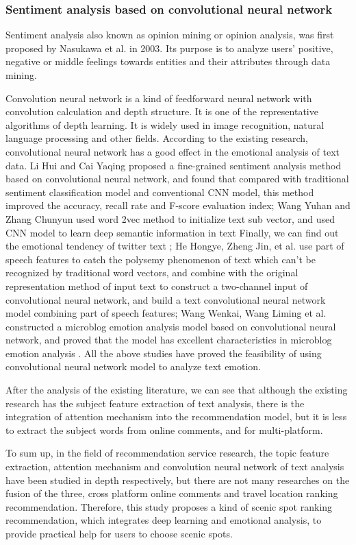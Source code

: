 \documentclass[conference]{IEEEtran}
\begin{document}
\subsubsection{Sentiment analysis based on convolutional neural network}
Sentiment analysis also known as opinion mining or opinion analysis, was first proposed by Nasukawa \cite{10} et al. in 2003. Its purpose is to analyze users' positive, negative or middle feelings towards entities and their attributes through data mining.

Convolution neural network is a kind of feedforward neural network with convolution calculation and depth structure. It is one of the representative algorithms of depth learning. It is widely used in image recognition, natural language processing and other fields. According to the existing research, convolutional neural network has a good effect in the emotional analysis of text data. Li Hui and Cai Yaqing proposed a fine-grained sentiment analysis method based on convolutional neural network, and found that compared with traditional sentiment classification model and conventional CNN model, this method improved the accuracy, recall rate and F-score evaluation index\cite{4}; Wang Yuhan and Zhang Chunyun used word 2vec method to initialize text sub vector, and used CNN model to learn deep semantic information in text Finally, we can find out the emotional tendency of twitter text \cite{5}; He Hongye, Zheng Jin, et al. use part of speech features to catch the polysemy phenomenon of text which can't be recognized by traditional word vectors, and combine with the original representation method of input text to construct a two-channel input of convolutional neural network, and build a text convolutional neural network model combining part of speech features\cite{7}; Wang Wenkai, Wang Liming et al. constructed a microblog emotion analysis model based on convolutional neural network, and proved that the model has excellent characteristics in microblog emotion analysis \cite{8}. All the above studies have proved the feasibility of using convolutional neural network model to analyze text emotion.

After the analysis of the existing literature, we can see that although the existing research has the subject feature extraction of text analysis, there is the integration of attention mechanism into the recommendation model, but it is less to extract the subject words from online comments, and for multi-platform.

To sum up, in the field of recommendation service research, the topic feature extraction, attention mechanism and convolution neural network of text analysis have been studied in depth respectively, but there are not many researches on the fusion of the three, cross platform online comments and travel location ranking recommendation. Therefore, this study proposes a kind of scenic spot ranking recommendation, which integrates deep learning and emotional analysis, to provide practical help for users to choose scenic spots.
\end{document}

